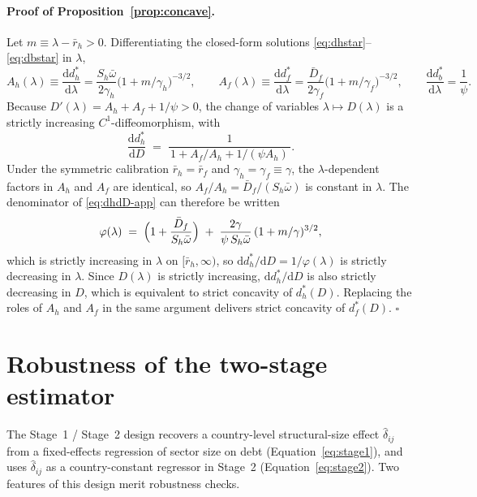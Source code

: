 \documentclass[\latexroot/\projectname]{subfiles}
\begin{document}
\paragraph{Proof of Proposition~\ref{prop:concave}.}
Let $m\equiv\lambda-\bar r_h>0$. Differentiating the closed-form
solutions \eqref{eq:dhstar}--\eqref{eq:dbstar} in $\lambda$,
\[
  A_h(\lambda)\equiv\frac{\mathrm{d}d_h^\ast}{\mathrm{d}\lambda}
    =\frac{S_h\bar\omega}{2\gamma_h}\bigl(1+m/\gamma_h\bigr)^{-3/2},
  \qquad
  A_f(\lambda)\equiv\frac{\mathrm{d}d_f^\ast}{\mathrm{d}\lambda}
    =\frac{\bar D_f}{2\gamma_f}\bigl(1+m/\gamma_f\bigr)^{-3/2},
  \qquad
  \frac{\mathrm{d}d_b^\ast}{\mathrm{d}\lambda}=\frac{1}{\psi}.
\]
Because $D'(\lambda)=A_h+A_f+1/\psi>0$, the change of variables
$\lambda\mapsto D(\lambda)$ is a strictly increasing
$C^{1}$-diffeomorphism, with
\begin{equation}\label{eq:dhdD-app}
  \frac{\mathrm{d}d_h^\ast}{\mathrm{d}D}
  \;=\;\frac{1}{\,1+A_f/A_h+1/(\psi A_h)\,}.
\end{equation}
Under the symmetric calibration $\bar r_h=\bar r_f$ and
$\gamma_h=\gamma_f\equiv\gamma$, the $\lambda$-dependent factors in
$A_h$ and $A_f$ are identical, so $A_f/A_h=\bar D_f/(S_h\bar\omega)$
is constant in $\lambda$. The denominator of \eqref{eq:dhdD-app} can
therefore be written
\[
  \varphi(\lambda)
  \;=\;\Bigl(1+\frac{\bar D_f}{S_h\bar\omega}\Bigr)
  \;+\;\frac{2\gamma}{\psi\,S_h\bar\omega}\,(1+m/\gamma)^{3/2},
\]
which is strictly increasing in $\lambda$ on $[\bar r_h,\infty)$, so
$\mathrm{d}d_h^\ast/\mathrm{d}D=1/\varphi(\lambda)$ is strictly
decreasing in $\lambda$. Since $D(\lambda)$ is strictly increasing,
$\mathrm{d}d_h^\ast/\mathrm{d}D$ is also strictly decreasing in $D$,
which is equivalent to strict concavity of $d_h^\ast(D)$. Replacing
the roles of $A_h$ and $A_f$ in the same argument delivers strict
concavity of $d_f^\ast(D)$. $\square$

\section{Robustness of the two-stage estimator}
\whenintegrated{\label{app:robustness}}

The Stage~1 / Stage~2 design recovers a country-level structural-size
effect $\hat\delta_{ij}$ from a fixed-effects regression of sector
size on debt (Equation~\eqref{eq:stage1}), and uses
$\hat\delta_{ij}$ as a country-constant regressor in Stage~2
(Equation~\eqref{eq:stage2}). Two features of this design merit
robustness checks.
\end{document}
